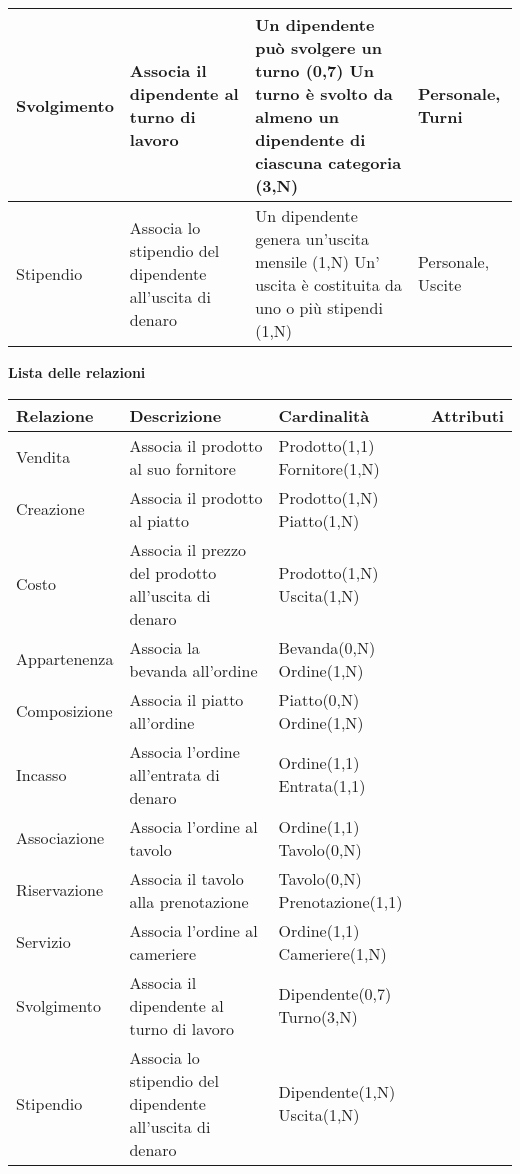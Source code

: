 \begin{longtable}{p{2.5cm} p{3cm} p{5.5cm} p{3cm}}
    Svolgimento & Associa il dipendente al turno di lavoro & Un dipendente può svolgere un turno (0,7) \newline Un turno è svolto da almeno un dipendente di ciascuna categoria (3,N) & Personale, Turni \\ \midrule
    Stipendio & Associa lo stipendio del dipendente all'uscita di denaro & Un dipendente genera un'uscita mensile (1,N) \newline Un' uscita è costituita da uno o più stipendi (1,N) & Personale, Uscite \\ \bottomrule
\end{longtable}

\textbf{Lista delle relazioni} %
\begin{longtable}{p{2.5cm} p{5.5cm} p{3.5cm} p{2.5cm}}
    \midrule
    \textbf{Relazione} & \textbf{Descrizione} & \textbf{Cardinalità} & \textbf{Attributi} \\ \midrule
    Vendita & Associa il prodotto al suo fornitore & Prodotto(1,1) \newline Fornitore(1,N) &  \\ \midrule
    Creazione & Associa il prodotto al piatto & Prodotto(1,N) \newline Piatto(1,N) & \\ \midrule
    Costo & Associa il prezzo del prodotto all'uscita di denaro & Prodotto(1,N) \newline Uscita(1,N) & \\ \midrule
    Appartenenza & Associa la bevanda all'ordine & Bevanda(0,N) \newline Ordine(1,N) &  \\ \midrule
    Composizione & Associa il piatto all'ordine & Piatto(0,N) \newline Ordine(1,N) &  \\ \midrule
    Incasso & Associa l'ordine all'entrata di denaro & Ordine(1,1) \newline Entrata(1,1) &  \\ \midrule
    Associazione & Associa l'ordine al tavolo & Ordine(1,1) \newline Tavolo(0,N) &  \\ \midrule
    Riservazione & Associa il tavolo alla prenotazione & Tavolo(0,N) \newline Prenotazione(1,1) &  \\ \midrule
    Servizio & Associa l'ordine al cameriere & Ordine(1,1) \newline Cameriere(1,N) & \\ \midrule
    Svolgimento & Associa il dipendente al turno di lavoro & Dipendente(0,7) \newline Turno(3,N) & \\ \midrule
    Stipendio & Associa lo stipendio del dipendente all'uscita di denaro & Dipendente(1,N) \newline Uscita(1,N) &  \\ \bottomrule
\end{longtable}

